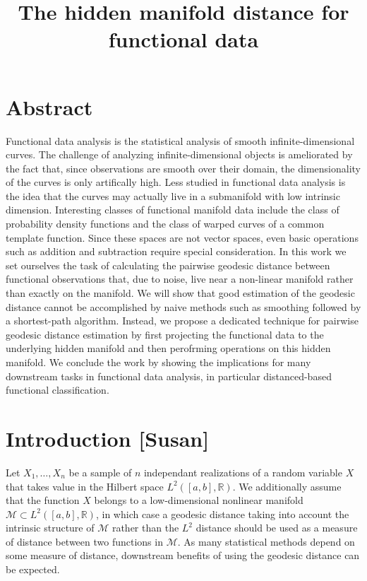 \documentclass[]{article}
\title{The hidden manifold distance for functional data}
\author{}
\date{}
\begin{document}
\maketitle

\newcommand {\To}{\rightarrow}
\newcommand {\TO}{\Rightarrow}
\newcommand {\R}{\mathbb{R}}
\newcommand {\Prob}{\mathbb{P}}
\newcommand{\E}{\mathbb{E}}
\newcommand {\cov}{\textrm{Cov}}
\newcommand {\var}{\textrm{Var}}
\newcommand {\1}{\textrm{\textbf{1}}}
\newcommand{\M}{\mathcal{M}}

\hypertarget{abstract}{%
\section{Abstract}\label{abstract}}

Functional data analysis is the statistical analysis of smooth
infinite-dimensional curves. The challenge of analyzing
infinite-dimensional objects is ameliorated by the fact that, since
observations are smooth over their domain, the dimensionality of the
curves is only artifically high. Less studied in functional data
analysis is the idea that the curves may actually live in a submanifold
with low intrinsic dimension. Interesting classes of functional manifold
data include the class of probability density functions and the class of
warped curves of a common template function. Since these spaces are not
vector spaces, even basic operations such as addition and subtraction
require special consideration. In this work we set ourselves the task of
calculating the pairwise geodesic distance between functional
observations that, due to noise, live near a non-linear manifold rather
than exactly on the manifold. We will show that good estimation of the
geodesic distance cannot be accomplished by naive methods such as
smoothing followed by a shortest-path algorithm. Instead, we propose a
dedicated technique for pairwise geodesic distance estimation by first
projecting the functional data to the underlying hidden manifold and
then perofrming operations on this hidden manifold. We conclude the work
by showing the implications for many downstream tasks in functional data
analysis, in particular distanced-based functional classification.

\hypertarget{introduction-susan}{%
\section{Introduction {[}Susan{]}}\label{introduction-susan}}

Let \(X_1,\ldots,X_n\) be a sample of \(n\) independant realizations of
a random variable \(X\) that takes value in the Hilbert space
\(L^2([a,b],\mathbb{R})\). We additionally assume that the function
\(X\) belongs to a low-dimensional nonlinear manifold
\(\mathcal{M}\subset L^2([a,b],\mathbb{R})\), in which case a geodesic
distance taking into account the intrinsic structure of \(\mathcal{M}\)
rather than the \(L^2\) distance should be used as a measure of distance
between two functions in \(\mathcal{M}\). As many statistical methods
depend on some measure of distance, downstream benefits of using the
geodesic distance can be expected.
\end{document}
